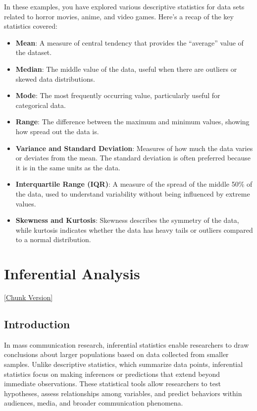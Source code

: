 \documentclass[
]{book}
\providecommand{\tightlist}{%
  \setlength{\itemsep}{0pt}\setlength{\parskip}{0pt}}
\begin{document}
In these examples, you have explored various descriptive statistics for data sets related to horror movies, anime, and video games. Here's a recap of the key statistics covered:

\begin{itemize}
\tightlist
\item
  \textbf{Mean}: A measure of central tendency that provides the ``average'' value of the dataset.
\item
  \textbf{Median}: The middle value of the data, useful when there are outliers or skewed data distributions.
\item
  \textbf{Mode}: The most frequently occurring value, particularly useful for categorical data.
\item
  \textbf{Range}: The difference between the maximum and minimum values, showing how spread out the data is.
\item
  \textbf{Variance and Standard Deviation}: Measures of how much the data varies or deviates from the mean. The standard deviation is often preferred because it is in the same units as the data.
\item
  \textbf{Interquartile Range (IQR)}: A measure of the spread of the middle 50\% of the data, used to understand variability without being influenced by extreme values.
\item
  \textbf{Skewness and Kurtosis}: Skewness describes the symmetry of the data, while kurtosis indicates whether the data has heavy tails or outliers compared to a normal distribution.
\end{itemize}

\chapter{Inferential Analysis}\label{inferential-analysis}

\href{files/10-inferential_stats-chunk.Rmd}{{[}Chunk Version{]}}

\section{Introduction}\label{introduction-1}

In mass communication research, inferential statistics enable researchers to draw conclusions about larger populations based on data collected from smaller samples. Unlike descriptive statistics, which summarize data points, inferential statistics focus on making inferences or predictions that extend beyond immediate observations. These statistical tools allow researchers to test hypotheses, assess relationships among variables, and predict behaviors within audiences, media, and broader communication phenomena.
\end{document}
